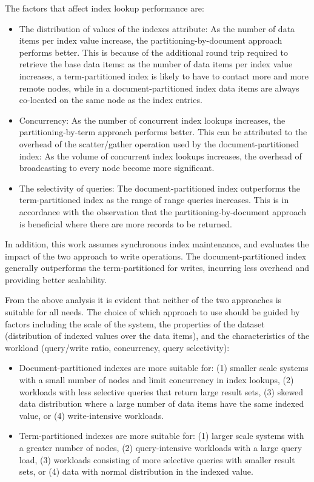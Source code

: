 The factors that affect index lookup performance are:
\begin{itemize}

  \item The distribution of values of the indexes attribute:
  As the number of data items per index value increase, the partitioning-by-document approach performs better.
  This is because of the additional round trip required to retrieve the base data items:
  as the number of data items per index value increases, a term-partitioned index is likely to have to contact
  more and more remote nodes, while in a document-partitioned index data items are always co-located on the same node as
  the index entries.

  \item Concurrency:
  As the number of concurrent index lookups increases, the partitioning-by-term approach performs better.
  This can be attributed to the overhead of the scatter/gather operation used by the document-partitioned index:
  As the volume of concurrent index lookups increases, the overhead of broadcasting to every node become more significant.

  \item The selectivity of queries:
  The document-partitioned index outperforms the term-partitioned index as the range of range queries increases.
  This is in accordance with the observation that the partitioning-by-document approach is beneficial where there are
  more records to be returned.

\end{itemize}

In addition, this work assumes synchronous index maintenance, and evaluates the impact of the two approach to write
operations.
The document-partitioned index generally outperforms the term-partitioned for writes, incurring less overhead
and providing better scalability.

From the above analysis it is evident that neither of the two approaches is suitable for all needs.
The choice of which approach to use should be guided by factors including the scale of the system, the properties of the
dataset (distribution of indexed values over the data items), and the characteristics of the workload (query/write ratio,
concurrency, query selectivity):
\begin{itemize}

  \item Document-partitioned indexes are more suitable for: (1) smaller scale systems with a small number of nodes and
  limit concurrency in index lookups, (2) workloads with less selective queries that return large result sets, (3)
  skewed data distribution where a large number of data items have the same indexed value, or (4) write-intensive
  workloads.

  \item Term-partitioned indexes are more suitable for: (1) larger scale systems with a greater number of nodes, (2)
  query-intensive workloads with a large query load, (3) workloads consisting of more selective queries with smaller
  result sets, or (4) data with normal distribution in the indexed value.

\end{itemize}

